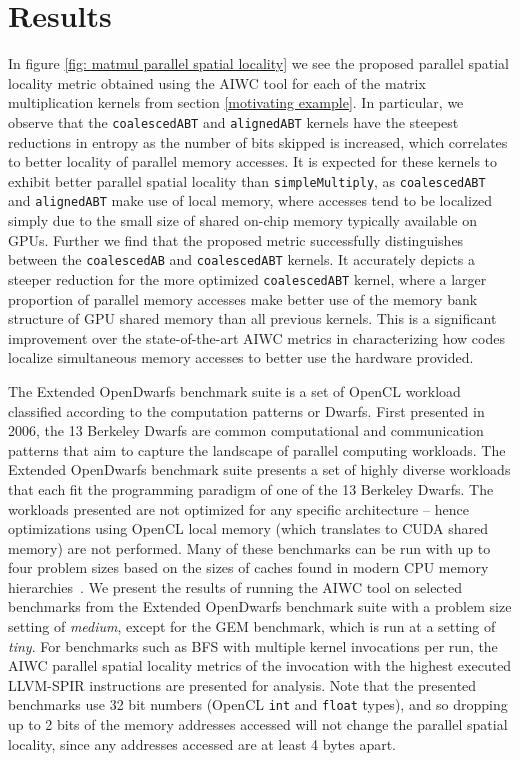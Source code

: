 \documentclass[review=false, sigchi]{acmart}
\begin{document}
	\section{Results} \label{results}
	
	In figure \ref{fig: matmul parallel spatial locality} we see the proposed parallel spatial locality metric obtained using the AIWC tool for each of the matrix multiplication kernels from section \ref{motivating example}.
	In particular, we observe that the \texttt{coalescedABT} and \texttt{alignedABT} kernels have the steepest reductions in entropy as the number of bits skipped is increased, which correlates to better locality of parallel memory accesses.
	It is expected for these kernels to exhibit better parallel spatial locality than \texttt{simpleMultiply}, as \texttt{coalescedABT} and \texttt{alignedABT} make use of local memory, where accesses tend to be localized simply due to the small size of shared on-chip memory typically available on GPUs.
	Further we find that the proposed metric successfully distinguishes between the \texttt{coalescedAB} and \texttt{coalescedABT} kernels.
	It accurately depicts a steeper reduction for the more optimized \texttt{coalescedABT} kernel, where a larger proportion of parallel memory accesses make better use of the memory bank structure of GPU shared memory than all previous kernels.
	This is a significant improvement over the state-of-the-art AIWC metrics in characterizing how codes localize simultaneous memory accesses to better use the hardware provided.
	
	The Extended OpenDwarfs benchmark suite is a set of OpenCL workload classified according to the computation patterns or Dwarfs. 
	First presented in 2006, the 13 Berkeley Dwarfs are common computational and communication patterns that aim to capture the landscape of parallel computing workloads. 
	The Extended OpenDwarfs benchmark suite presents a set of highly diverse workloads that each fit the programming paradigm of one of the 13 Berkeley Dwarfs.
	The workloads presented are not optimized for any specific architecture -- hence optimizations using OpenCL local memory (which translates to CUDA shared memory) are not performed. 
	Many of these benchmarks can be run with up to four problem sizes based on the sizes of caches found in modern CPU memory hierarchies~\cite{johnston18opendwarfs}.
	We present the results of running the AIWC tool on selected benchmarks from the Extended OpenDwarfs benchmark suite \cite{opendwarfs2020head,johnston18opendwarfs} with a problem size setting of \emph{medium}, except for the GEM benchmark, which is run at a setting of \emph{tiny}.
	For benchmarks such as BFS with multiple kernel invocations per run, the AIWC parallel spatial locality metrics of the invocation with the highest executed LLVM-SPIR instructions are presented for analysis. Note that the presented benchmarks use 32 bit numbers (OpenCL \texttt{int} and \texttt{float} types), and so dropping up to 2 bits of the memory addresses accessed will not change the parallel spatial locality, since any addresses accessed are at least 4 bytes apart.
	
\end{document}

